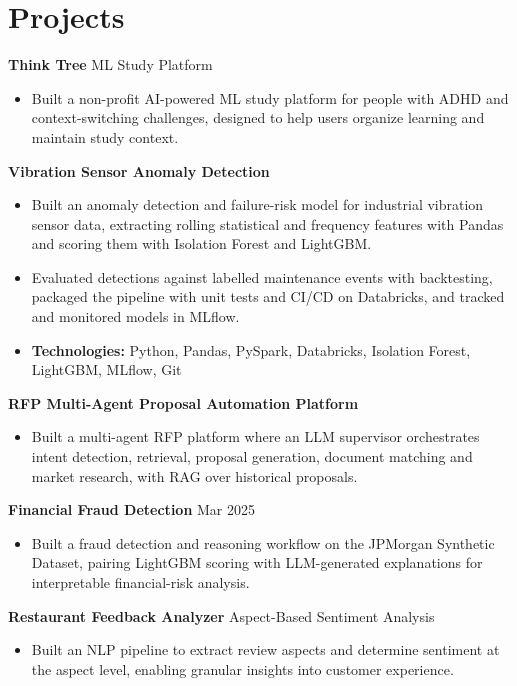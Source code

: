\documentclass[10pt,a4paper]{article}
\begin{document}
\section{Projects}
\textbf{Think Tree} \textbar{} ML Study Platform\par
\begin{itemize}
  \item Built a non-profit AI-powered ML study platform for people with ADHD and context-switching challenges, designed to help users organize learning and maintain study context.
\end{itemize}
\textbf{Vibration Sensor Anomaly Detection}\par
\begin{itemize}
  \item Built an anomaly detection and failure-risk model for industrial vibration sensor data, extracting rolling statistical and frequency features with Pandas and scoring them with Isolation Forest and LightGBM.
  \item Evaluated detections against labelled maintenance events with backtesting, packaged the pipeline with unit tests and CI/CD on Databricks, and tracked and monitored models in MLflow.
  \item \textbf{Technologies:} Python, Pandas, PySpark, Databricks, Isolation Forest, LightGBM, MLflow, Git
\end{itemize}
\textbf{RFP Multi-Agent Proposal Automation Platform}\par
\begin{itemize}
  \item Built a multi-agent RFP platform where an LLM supervisor orchestrates intent detection, retrieval, proposal generation, document matching and market research, with RAG over historical proposals.
\end{itemize}
\textbf{Financial Fraud Detection} \textbar{} Mar 2025\par
\begin{itemize}
  \item Built a fraud detection and reasoning workflow on the JPMorgan Synthetic Dataset, pairing LightGBM scoring with LLM-generated explanations for interpretable financial-risk analysis.
\end{itemize}
\textbf{Restaurant Feedback Analyzer} \textbar{} Aspect-Based Sentiment Analysis\par
\begin{itemize}
  \item Built an NLP pipeline to extract review aspects and determine sentiment at the aspect level, enabling granular insights into customer experience.
\end{itemize}
\end{document}
